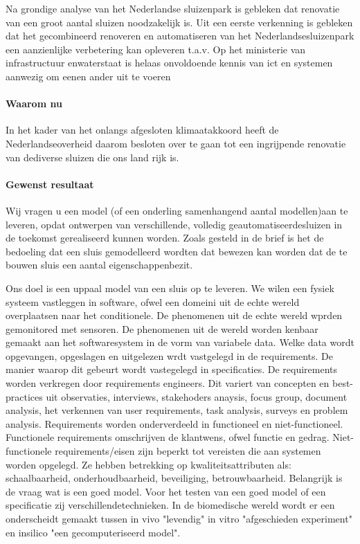 \documentclass{article}
\begin{document}
	Na grondige analyse van het Nederlandse sluizenpark is gebleken dat renovatie van een groot aantal sluizen noodzakelijk is.  Uit een eerste verkenning is gebleken  dat het gecombineerd renoveren en automatiseren van het Nederlandsesluizenpark een aanzienlijke verbetering kan opleveren t.a.v. 
	Op  het  ministerie  van  infrastructuur  enwaterstaat is helaas onvoldoende kennis van ict en systemen aanwezig om eenen ander uit te voeren 
	
	\paragraph{Waarom nu}
	In  het  kader  van  het  onlangs  afgesloten  klimaatakkoord  heeft  de  Nederlandseoverheid  daarom  besloten  over  te  gaan  tot  een  ingrijpende  renovatie  van  dediverse  sluizen  die  ons  land  rijk  is.     
	
	\paragraph{Gewenst resultaat }
	
	
	Wij vragen u een model (of een onderling samenhangend aantal modellen)aan  te  leveren,  opdat  ontwerpen  van  verschillende,  volledig  geautomatiseerdesluizen in de toekomst gerealiseerd kunnen worden. 
	Zoals  gesteld  in  de  brief  is  het  de  bedoeling  dat  een  sluis  gemodelleerd  wordten  dat  bewezen  kan  worden  dat  de  te  bouwen  sluis  een  aantal  eigenschappenbezit.  
	
	Ons doel is een uppaal model van een sluis op te leveren. We wilen een fysiek systeem vastleggen in software, ofwel een domeini uit de echte wereld overplaatsen naar het conditionele. De phenomenen  uit de echte wereld wprden gemonitored met sensoren.
	De phenomenen uit de wereld worden kenbaar gemaakt aan het softwaresystem in de vorm van variabele data.
	Welke data wordt opgevangen, opgeslagen en uitgelezen wrdt vastgelegd in de requirements. De manier waarop dit gebeurt wordt vastegelegd in specificaties.
	De requirements worden verkregen door requirements engineers. Dit variert  van concepten en best-practices uit observaties, interviews, stakehoders anaysis, focus group, document analysis, het verkennen van user requirements, 
	task analysis, surveys en problem analysis.
	Requirements worden onderverdeeld in functioneel en niet-functioneel.
	Functionele requirements omschrijven de klantwens, ofwel functie en gedrag. Niet-functionele requirements/eisen zijn beperkt  tot vereisten die aan systemen worden opgelegd. Ze hebben betrekking op kwaliteitsattributen als: schaalbaarheid, onderhoudbaarheid, beveiliging, betrouwbaarheid.
	Belangrijk is de vraag wat is een goed model. Voor het testen van een goed model of een specificatie zij verschillendetechnieken. In de biomedische wereld wordt er een onderscheidt gemaakt tussen  in vivo "levendig" in vitro "afgeschieden experiment" en insilico "een gecomputeriseerd model".
	
\end{document}
